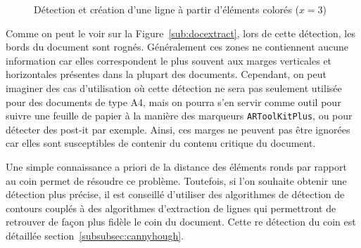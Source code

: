 \begin{figure}[H]
\centering
      \caption{Détection et création d'une ligne à partir d'éléments colorés ($x = 3$)}
      \label{fig:doc:linecluster}
\end{figure}

Comme on peut le voir sur la Figure~\ref{sub:docextract}, lors de cette détection, les bords du document sont rognés. Généralement ces zones ne contiennent aucune information car elles correspondent le plus souvent aux marges verticales et horizontales présentes dans la plupart des documents. Cependant, on peut imaginer des cas d'utilisation où cette détection ne sera pas seulement utilisée pour des documents de type A4, mais on pourra s'en servir comme outil pour suivre une feuille de papier à la manière des marqueurs \texttt{ARToolKitPlus}, ou pour détecter des post-it par exemple. Ainsi, ces marges ne peuvent pas être ignorées car elles sont susceptibles de contenir du contenu critique du document.

Une simple connaissance a priori de la distance des éléments ronds par rapport au coin permet de résoudre ce problème. Toutefois, si l'on souhaite obtenir une détection plus précise, il est conseillé d'utiliser des algorithmes de détection de contours couplés à des algorithmes d'extraction de lignes qui permettront de retrouver de façon plus fidèle le coin du document. Cette re détection du coin est détaillée section~\ref{subsubsec:cannyhough}.

